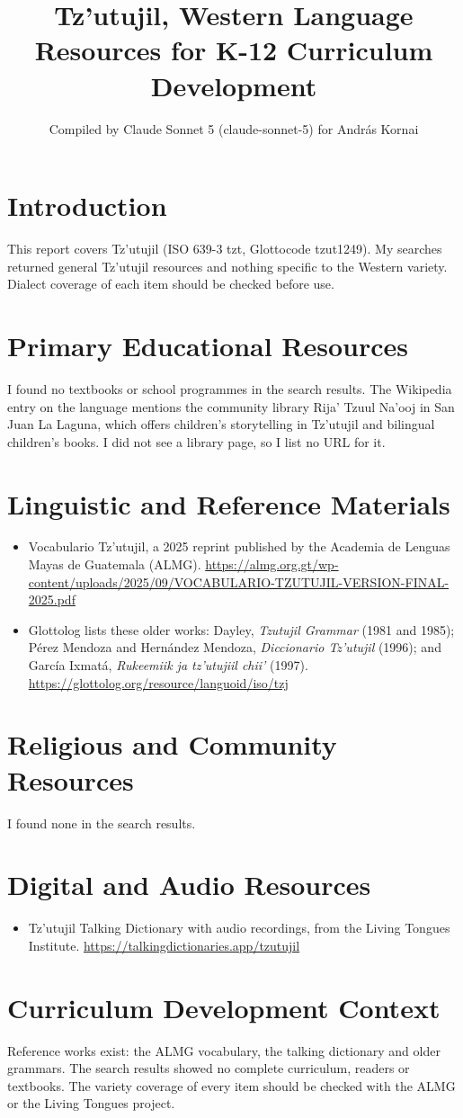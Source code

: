 \documentclass[12pt]{article}
\title{Tz'utujil, Western Language Resources for K-12 Curriculum Development}
\author{Compiled by Claude Sonnet 5 (claude-sonnet-5) for Andr\'as Kornai}
\date{}
\begin{document}
\maketitle

\section{Introduction}
This report covers Tz'utujil (ISO 639-3 tzt, Glottocode tzut1249). My searches returned general Tz'utujil resources and nothing specific to the Western variety. Dialect coverage of each item should be checked before use.

\section{Primary Educational Resources}
I found no textbooks or school programmes in the search results. The Wikipedia entry on the language mentions the community library Rija' Tzuul Na'ooj in San Juan La Laguna, which offers children's storytelling in Tz'utujil and bilingual children's books. I did not see a library page, so I list no URL for it.

\section{Linguistic and Reference Materials}
\begin{itemize}
\item Vocabulario Tz'utujil, a 2025 reprint published by the Academia de Lenguas Mayas de Guatemala (ALMG). \url{https://almg.org.gt/wp-content/uploads/2025/09/VOCABULARIO-TZUTUJIL-VERSION-FINAL-2025.pdf}
\item Glottolog lists these older works: Dayley, \emph{Tzutujil Grammar} (1981 and 1985); P\'erez Mendoza and Hern\'andez Mendoza, \emph{Diccionario Tz'utujil} (1996); and Garc\'ia Ixmat\'a, \emph{Rukeemiik ja tz'utujiil chii'} (1997). \url{https://glottolog.org/resource/languoid/iso/tzj}
\end{itemize}

\section{Religious and Community Resources}
I found none in the search results.

\section{Digital and Audio Resources}
\begin{itemize}
\item Tz'utujil Talking Dictionary with audio recordings, from the Living Tongues Institute. \url{https://talkingdictionaries.app/tzutujil}
\end{itemize}

\section{Curriculum Development Context}
Reference works exist: the ALMG vocabulary, the talking dictionary and older grammars. The search results showed no complete curriculum, readers or textbooks. The variety coverage of every item should be checked with the ALMG or the Living Tongues project.
\end{document}
